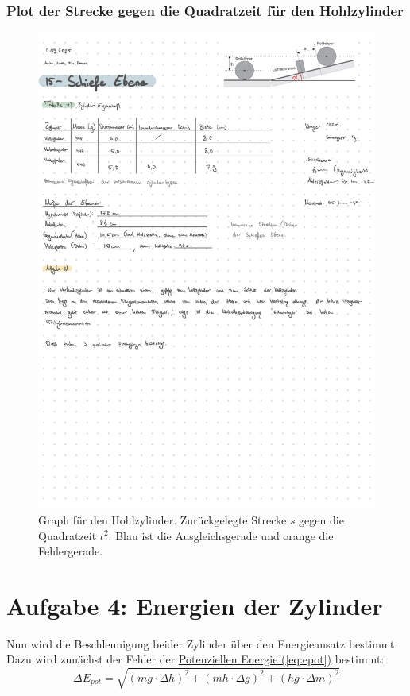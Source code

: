 \newpage
\subsubsection*{Plot der Strecke gegen die Quadratzeit für den Hohlzylinder}
\begin{figure}[!ht]
    \centering
    \hspace*{-2.35cm}
    \includegraphics[width=1.3\textwidth, page=4]{Protokolle/15/Chapter/Messprotokoll}
    \caption{Graph für den Hohlzylinder. Zurückgelegte Strecke $s$ gegen die Quadratzeit $t^2$. Blau ist die Ausgleichsgerade und orange die Fehlergerade.}
    \label{fig:hohl}
\end{figure}

\twocolumn

\section{Aufgabe 4: Energien der Zylinder}
Nun wird die Beschleunigung beider Zylinder über den Energieansatz bestimmt. Dazu wird zunächst der Fehler der \hyperref[eq:epot]{Potenziellen Energie (\ref*{eq:epot})} bestimmt:
\begin{equation}
    \Delta E_{pot} = \sqrt{\left(mg \cdot \Delta h \right)^2 + \left(mh \cdot \Delta g \right)^2 + \left(hg \cdot \Delta m \right)^2}
\end{equation}

